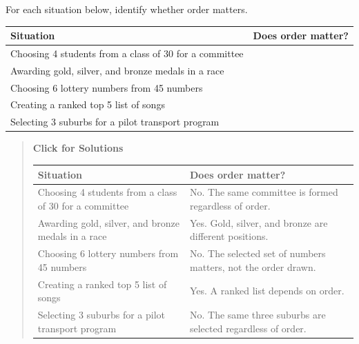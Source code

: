 \documentclass[
  letterpaper,
  DIV=11,
  numbers=noendperiod]{scrreprt}
\begin{document}
\begin{tcolorbox}[enhanced jigsaw, arc=.35mm, bottomrule=.15mm, bottomtitle=1mm, breakable, colback=white, colbacktitle=quarto-callout-note-color!10!white, colframe=quarto-callout-note-color-frame, coltitle=black, left=2mm, leftrule=.75mm, opacityback=0, opacitybacktitle=0.6, rightrule=.15mm, title=\textcolor{quarto-callout-note-color}{\faInfo}\hspace{0.5em}{Question 13}, titlerule=0mm, toprule=.15mm, toptitle=1mm]

For each situation below, identify whether order matters.

\begin{table}
\fontsize{12.0pt}{14.0pt}\selectfont
\begin{tabular*}{\linewidth}{@{\extracolsep{\fill}}ll}
\toprule
Situation & Does order matter? \\ 
\midrule\addlinespace[2.5pt]
Choosing 4 students from a class of 30 for a committee &  \\ 
Awarding gold, silver, and bronze medals in a race &  \\ 
Choosing 6 lottery numbers from 45 numbers &  \\ 
Creating a ranked top 5 list of songs &  \\ 
Selecting 3 suburbs for a pilot transport program &  \\ 
\bottomrule
\end{tabular*}
\end{table}

\begin{quote}
\textbf{Click for Solutions}

\begin{table}
\fontsize{12.0pt}{14.0pt}\selectfont
\begin{tabular*}{\linewidth}{@{\extracolsep{\fill}}ll}
\toprule
Situation & Does order matter? \\ 
\midrule\addlinespace[2.5pt]
Choosing 4 students from a class of 30 for a committee & No. The same committee is formed regardless of order. \\ 
Awarding gold, silver, and bronze medals in a race & Yes. Gold, silver, and bronze are different positions. \\ 
Choosing 6 lottery numbers from 45 numbers & No. The selected set of numbers matters, not the order drawn. \\ 
Creating a ranked top 5 list of songs & Yes. A ranked list depends on order. \\ 
Selecting 3 suburbs for a pilot transport program & No. The same three suburbs are selected regardless of order. \\ 
\bottomrule
\end{tabular*}
\end{table}
\end{quote}

\end{tcolorbox}
\end{document}
